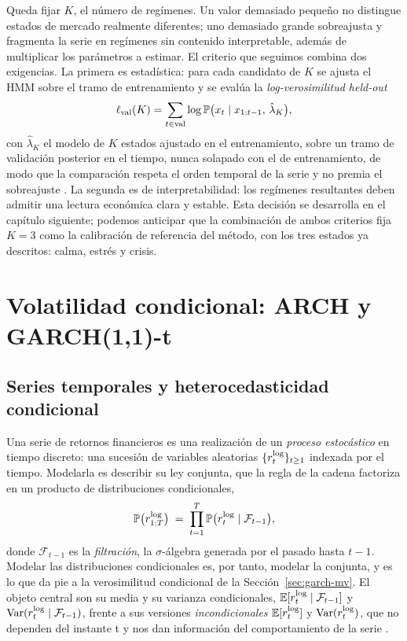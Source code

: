 Queda fijar $K$, el número de regímenes. Un valor demasiado pequeño no distingue estados de mercado realmente diferentes; uno demasiado grande sobreajusta y fragmenta la serie en regímenes sin contenido interpretable, además de multiplicar los parámetros a estimar. El criterio que seguimos combina dos exigencias. La primera es estadística: para cada candidato de $K$ se ajusta el HMM sobre el tramo de entrenamiento y se evalúa la \emph{log-verosimilitud held-out}
\[
\ell_{\mathrm{val}}(K) = \sum_{t \in \mathrm{val}} \log \mathbb{P}\big(x_t \mid x_{1:t-1},\, \hat{\lambda}_K\big),
\]
con $\hat{\lambda}_K$ el modelo de $K$ estados ajustado en el entrenamiento, sobre un tramo de validación posterior en el tiempo, nunca solapado con el de entrenamiento, de modo que la comparación respeta el orden temporal de la serie y no premia el sobreajuste \cite{rabiner1989}. La segunda es de interpretabilidad: los regímenes resultantes deben admitir una lectura económica clara y estable. Esta decisión se desarrolla en el capítulo siguiente; podemos anticipar que la combinación de ambos criterios fija $K = 3$ como la calibración de referencia del método, con los tres estados ya descritos: calma, estrés y crisis.

\section{Volatilidad condicional: ARCH y GARCH(1,1)-t}
\label{sec:garch}

\subsection{Series temporales y heterocedasticidad condicional}
\label{sec:garch-intro}

Una serie de retornos financieros es una realización de un \emph{proceso estocástico} en tiempo discreto: una sucesión de variables aleatorias $\{r_t^{\log}\}_{t \ge 1}$ indexada por el tiempo. Modelarla es describir su ley conjunta, que la regla de la cadena factoriza en un producto de distribuciones condicionales,
\[
\mathbb{P}\big(r^{\log}_{1:T}\big) \;=\; \prod_{t=1}^{T} \mathbb{P}\big(r_t^{\log} \mid \mathcal{F}_{t-1}\big),
\]
donde $\mathcal{F}_{t-1}$ es la \emph{filtración}, la $\sigma$-álgebra generada por el pasado hasta $t-1$. Modelar las distribuciones condicionales es, por tanto, modelar la conjunta, y es lo que da pie a la verosimilitud condicional de la Sección~\ref{sec:garch-mv}. El objeto central son su media y su varianza condicionales, $\mathbb{E}[r_t^{\log} \mid \mathcal{F}_{t-1}]$ y $\operatorname{Var}(r_t^{\log} \mid \mathcal{F}_{t-1})$, frente a sus versiones \emph{incondicionales} $\mathbb{E}[r_t^{\log}]$ y $\operatorname{Var}(r_t^{\log})$, que no dependen del instante t y nos dan información del comportamiento de la serie \cite{hamilton1994, tsay2010}.

